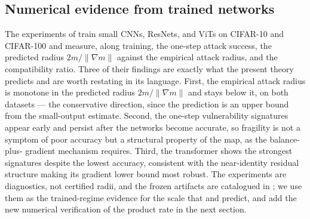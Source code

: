 \subsection{Numerical evidence from trained networks}
The experiments of \cite{advExt} train small CNNs, ResNets, and ViTs on CIFAR-10 and CIFAR-100 and
measure, along training, the one-step attack success, the predicted radius $2m/\|\nabla m\|$ against the
empirical attack radius, and the compatibility ratio. Three of their findings are exactly what the
present theory predicts and are worth restating in its language. First, the empirical attack radius is
monotone in the predicted radius $2m/\|\nabla m\|$ and stays below it, on both datasets --- the
conservative direction, since the prediction is an upper bound from the small-output estimate. Second,
the one-step vulnerability signatures appear early and persist after the networks become accurate, so
fragility is not a symptom of poor accuracy but a structural property of the map, as the balance-plus-%
gradient mechanism requires. Third, the transformer shows the strongest signatures despite the lowest
accuracy, consistent with the near-identity residual structure making its gradient lower bound most
robust. The experiments are diagnostics, not certified radii, and the frozen artifacts are catalogued in
\cite{advExt}; we use them as the trained-regime evidence for the scale that  and
 predict, and add the new numerical verification of the product rate in the next section.
